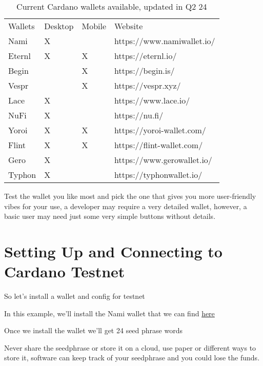 \begin{table}[h!]
  \caption{Current Cardano wallets available, updated in Q2 24}
  \begin{tabular}{llll}
    Wallets & Desktop & Mobile & Website                    \\
    Nami    & X       &        & https://www.namiwallet.io/ \\
    Eternl  & X       & X      & https://eternl.io/         \\
    Begin   &         & X      & https://begin.is/          \\
    Vespr   &         & X      & https://vespr.xyz/         \\
    Lace    & X       &        & https://www.lace.io/       \\
    NuFi    & X       &        & https://nu.fi/             \\
    Yoroi   & X       & X      & https://yoroi-wallet.com/  \\
    Flint   & X       & X      & https://flint-wallet.com/  \\
    Gero    & X       &        & https://www.gerowallet.io/ \\
    Typhon  & X       &        & https://typhonwallet.io/   \\
  \end{tabular}
\end{table}

Test the wallet you like most and pick the one that gives you more user-friendly vibes for your use, a developer may require a very detailed wallet, however, a basic user may need just some very simple buttons without details.

\section{Setting Up and Connecting to Cardano Testnet}
So let's install a wallet and config for testnet

In this example, we'll install the Nami wallet that we can find \href{https://www.namiwallet.io/}{here}

Once we install the wallet we'll get 24 seed phrase words

\begin{remark}
  Never share the seedphrase or store it on a cloud, use paper or different ways to store it, software can keep track of your seedphrase and you could lose the funds.
\end{remark}

